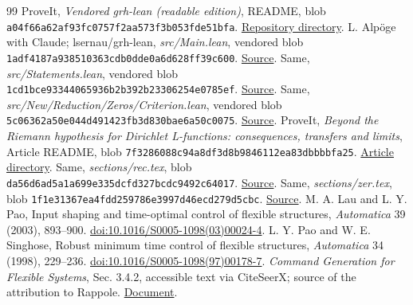 \documentclass[11pt]{article}
\theoremstyle{remark}\newtheorem{remark}[theorem]{Remark}
\begin{document}
\begin{thebibliography}{99}
 ProveIt, \emph{Vendored grh-lean (readable edition)}, README, blob \texttt{a04f66a62af93fc0757f2aa573f3b053fde51bfa}. \href{https://github.com/VladimirReshetnikov/ProveIt/tree/main/Analysis/GeneralizedRiemannHypothesis/vendor/grh-lean}{Repository directory}.
 L. Alp\"oge with Claude; lsernau/grh-lean, \emph{src/Main.lean}, vendored blob \texttt{1adf4187a938510363cdb0dde0a6d628ff39c600}. \href{https://github.com/VladimirReshetnikov/ProveIt/blob/main/Analysis/GeneralizedRiemannHypothesis/vendor/grh-lean/grh/src/Main.lean}{Source}.
 Same, \emph{src/Statements.lean}, vendored blob \texttt{1cd1bce93344065936b2b392b23306254e0785ef}. \href{https://github.com/VladimirReshetnikov/ProveIt/blob/main/Analysis/GeneralizedRiemannHypothesis/vendor/grh-lean/grh/src/Statements.lean}{Source}.
 Same, \emph{src/New/Reduction/Zeros/Criterion.lean}, vendored blob \texttt{5c06362a50e044d491423fb3d830bae6a50c0075}. \href{https://github.com/VladimirReshetnikov/ProveIt/blob/main/Analysis/GeneralizedRiemannHypothesis/vendor/grh-lean/grh/src/New/Reduction/Zeros/Criterion.lean}{Source}.
 ProveIt, \emph{Beyond the Riemann hypothesis for Dirichlet L-functions: consequences, transfers and limits}, Article README, blob \texttt{7f3286088c94a8df3d8b9846112ea83dbbbbfa25}. \href{https://github.com/VladimirReshetnikov/ProveIt/tree/main/Analysis/GeneralizedRiemannHypothesis/Article}{Article directory}.
 Same, \emph{sections/rec.tex}, blob \texttt{da56d6ad5a1a699e335dcfd327bcdc9492c64017}. \href{https://github.com/VladimirReshetnikov/ProveIt/blob/main/Analysis/GeneralizedRiemannHypothesis/Article/sections/rec.tex}{Source}.
 Same, \emph{sections/zer.tex}, blob \texttt{1f1e31367ea4fdd259786e3997d46ecd279d5cbc}. \href{https://github.com/VladimirReshetnikov/ProveIt/blob/main/Analysis/GeneralizedRiemannHypothesis/Article/sections/zer.tex}{Source}.
 M. A. Lau and L. Y. Pao, Input shaping and time-optimal control of flexible structures, \emph{Automatica} 39 (2003), 893--900. \href{https://doi.org/10.1016/S0005-1098(03)00024-4}{doi:10.1016/S0005-1098(03)00024-4}.
 L. Y. Pao and W. E. Singhose, Robust minimum time control of flexible structures, \emph{Automatica} 34 (1998), 229--236. \href{https://doi.org/10.1016/S0005-1098(97)00178-7}{doi:10.1016/S0005-1098(97)00178-7}.
 \emph{Command Generation for Flexible Systems}, Sec. 3.4.2, accessible text via CiteSeerX; source of the attribution to Rappole. \href{https://citeseerx.ist.psu.edu/document?doi=7aae7b1b0fce193f503c9cc523af9972fcf16e68\&repid=rep1\&type=pdf}{Document}.
\end{thebibliography}
\end{document}
